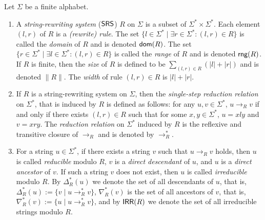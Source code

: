 \begin{definition}
Let $\Sigma$ be a finite alphabet.

\begin{enumerate}
\item A \emph{string-rewriting system} ($\mbox{\sf SRS}$) $R$ on $\Sigma$ is a subset of $\Sigma^* \times \Sigma^*$. Each element $(l, r)$ of $R$ is a \emph{(rewrite) rule}. The set $\{l \in \Sigma^* \mid \exists r \in \Sigma^*: (l, r) \in R\}$ is called the \emph{domain} of $R$ and is denoted $\dom(R)$. The set $\{r \in \Sigma^* \mid \exists l \in \Sigma^*: (l, r) \in R\}$ is called the \emph{range} of $R$ and is denoted $\rng(R)$. If $R$ is finite, then the \emph{size} of $R$ is defined to be $\sum_{(l,r) \in R}(|l| + |r|)$ and is denoted $\|R\|$. The \emph{width} of rule $(l,r) \in R$ is $|l| + |r|$.
\item If $R$ is a string-rewriting system on $\Sigma$, then the \emph{single-step reduction relation} on $\Sigma^*$, that is induced by $R$ is defined as follows: for any $u, v \in \Sigma^*$, $u \to_R v$ if and only if there exists $(l, r) \in R$ such that for some $x, y \in \Sigma^*$, $u = xly$ and $v = xry$. The \emph{reduction relation} on $\Sigma^*$ induced by $R$ is the reflexive and transitive closure of $\to_R$ and is denoted by $\to^*_R$.
\item For a string $u \in \Sigma^*$, if there exists a string $v$ such that $u \to_R v$ holds, then $u$ is called \emph{reducible} modulo $R$, $v$ is a \emph{direct descendant} of $u$, and $u$ is a \emph{direct ancestor} of $v$. If such a string $v$ does not exist, then $u$ is called \emph{irreducible} modulo $R$. By $\Delta_R^*(u)$ we denote the set of all descendants of $u$, that is, $\Delta_R^*(u) := \{v \mid u \to_R^* v\}$, $\nabla_R^*(v)$ is the set of all ancestors of $v$, that is, $\nabla_R^*(v) := \{u \mid u \to_R^* v\}$, and by $\IRR(R)$ we denote the set of all irreducible strings modulo $R$.
\end{enumerate}
\end{definition}

